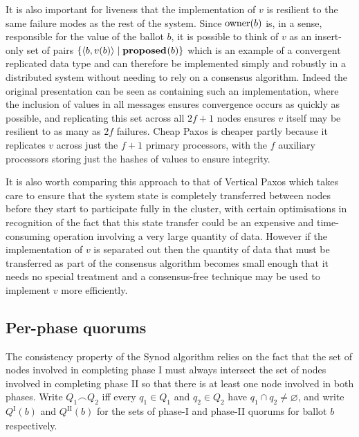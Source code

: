 \documentclass[journal]{IEEEtran}
\begin{document}
It is also important for liveness that the implementation of $v$ is resilient
to the same failure modes as the rest of the system. Since $\mathrm{owner}(b)$ is, in a
sense, responsible for the value of the ballot $b$, it is possible to think of
$v$ as an insert-only set of pairs ${\{ \langle b, v(b) \rangle \mid \mathbf{proposed}_{}(b)
\}}$ which is an example of a convergent replicated data type\cite{crdts} and
can therefore be implemented simply and robustly in a distributed system
without needing to rely on a consensus algorithm.  Indeed the original
presentation can be seen as containing such an implementation, where the
inclusion of values in all messages ensures convergence occurs as quickly as
possible, and replicating this set across all ${2f+1}$ nodes ensures $v$ itself
may be resilient to as many as $2f$ failures.  Cheap Paxos\cite{cheap-paxos} is
cheaper partly because it replicates $v$ across just the ${f+1}$ primary
processors, with the $f$ auxiliary processors storing just the hashes of values
to ensure integrity.

It is also worth comparing this approach to that of Vertical
Paxos\cite{vertical-paxos} which takes care to ensure that the system state is
completely transferred between nodes before they start to participate fully in
the cluster, with certain optimisations in recognition of the fact that this
state transfer could be an expensive and time-consuming operation involving a
very large quantity of data. However if the implementation of $v$ is separated
out then the quantity of data that must be transferred as part of the consensus
algorithm becomes small enough that it needs no special treatment and a
consensus-free technique may be used to implement $v$ more efficiently.

\subsection{Per-phase quorums}\label{per-phase-quorums}

\def\I#1#2{{#1}^\textrm{I}_{#2}}
\def\II#1#2{{#1}^\textrm{II}_{#2}}
\def\QI#1{\I{Q}{#1}}
\def\QII#1{\II{Q}{#1}}

The consistency property of the Synod algorithm relies on the fact that the set
of nodes involved in completing phase I must always intersect the set of nodes
involved in completing phase II so that there is at least one node involved in
both phases.  Write $Q_1 \frown Q_2$ iff every $q_1 \in Q_1$ and $q_2 \in Q_2$
have ${q_1 \cap q_2 \ne \varnothing}$, and write $\QI{}(b)$ and $\QII{}(b)$ for
the sets of phase-I and phase-II quorums for ballot $b$ respectively.
\end{document}
